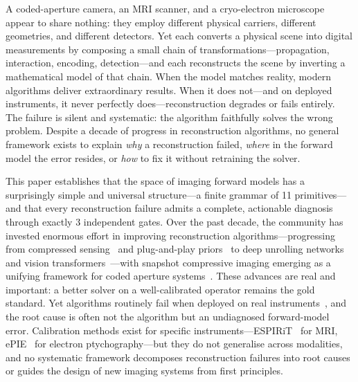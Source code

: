 \begin{sloppypar}
A coded-aperture camera, an MRI scanner, and a cryo-electron microscope appear to share nothing: they employ different physical carriers, different geometries, and different detectors. Yet each converts a physical scene into digital measurements by composing a small chain of transformations---propagation, interaction, encoding, detection---and each reconstructs the scene by inverting a mathematical model of that chain. When the model matches reality, modern algorithms deliver extraordinary results. When it does not---and on deployed instruments, it never perfectly does---reconstruction degrades or fails entirely. The failure is silent and systematic: the algorithm faithfully solves the wrong problem. Despite a decade of progress in reconstruction algorithms, no general framework exists to explain \emph{why} a reconstruction failed, \emph{where} in the forward model the error resides, or \emph{how} to fix it without retraining the solver.
\end{sloppypar}

This paper establishes that the space of imaging forward models has a surprisingly simple and universal structure---a finite grammar of 11 primitives---and that every reconstruction failure admits a complete, actionable diagnosis through exactly 3 independent gates. Over the past decade, the community has invested enormous effort in improving reconstruction algorithms---progressing from compressed sensing~\cite{candes2008compressed,donoho2006compressed} and plug-and-play priors~\cite{venkatakrishnan2013pnp,yuan2021pnp} to deep unrolling networks~\cite{monga2021unrolling} and vision transformers~\cite{cai2022mst}---with snapshot compressive imaging emerging as a unifying framework for coded aperture systems~\cite{yuan2021sci}. These advances are real and important: a better solver on a well-calibrated operator remains the gold standard. Yet algorithms routinely fail when deployed on real instruments~\cite{antun2020instabilities}, and the root cause is often not the algorithm but an undiagnosed forward-model error. Calibration methods exist for specific instruments---ESPIRiT~\cite{uecker2014espirit} for MRI, ePIE~\cite{maiden2009ptychography} for electron ptychography---but they do not generalise across modalities, and no systematic framework decomposes reconstruction failures into root causes or guides the design of new imaging systems from first principles.

